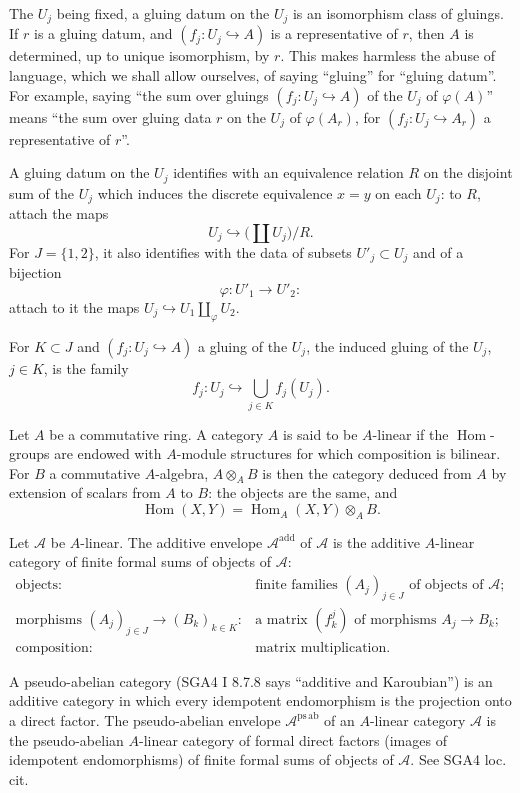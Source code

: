 \documentclass[11pt]{article}
\newcommand{\Hom}{\operatorname{Hom}}
\newcommand{\psab}{\mathrm{ps\,ab}}
\newcommand{\add}{\mathrm{add}}
\theoremstyle{deligne}
\newcommand{\para}[1]{\vspace{0.65em}\noindent{\bfseries #1}\quad}
\begin{document}
The \(U_j\) being fixed, a gluing datum on the \(U_j\) is an isomorphism class of gluings. If \(r\) is a gluing datum, and \((f_j:U_j\hookrightarrow A)\) is a representative of \(r\), then \(A\) is determined, up to unique isomorphism, by \(r\). This makes harmless the abuse of language, which we shall allow ourselves, of saying ``gluing'' for ``gluing datum''. For example, saying ``the sum over gluings \((f_j:U_j\hookrightarrow A)\) of the \(U_j\) of \(\varphi(A)\)'' means ``the sum over gluing data \(r\) on the \(U_j\) of \(\varphi(A_r)\), for \((f_j:U_j\hookrightarrow A_r)\) a representative of \(r\)''.

A gluing datum on the \(U_j\) identifies with an equivalence relation \(R\) on the disjoint sum of the \(U_j\) which induces the discrete equivalence \(x=y\) on each \(U_j\): to \(R\), attach the maps
\[
  U_j\hookrightarrow \bigl(\coprod U_j\bigr)/R.
\]
For \(J=\{1,2\}\), it also identifies with the data of subsets \(U'_j\subset U_j\) and of a bijection
\[
  \varphi:U'_1\longrightarrow U'_2:
\]
attach to it the maps \(U_j\hookrightarrow U_1\coprod_\varphi U_2\).

For \(K\subset J\) and \((f_j:U_j\hookrightarrow A)\) a gluing of the \(U_j\), the induced gluing of the \(U_j\), \(j\in K\), is the family
\[
  f_j:U_j\hookrightarrow \bigcup_{j\in K} f_j(U_j).
\]

\para{1.6.}
Let \(A\) be a commutative ring. A category \(A\) is said to be \(A\)-linear if the \(\Hom\)-groups are endowed with \(A\)-module structures for which composition is bilinear. For \(B\) a commutative \(A\)-algebra, \(A\otimes_A B\) is then the category deduced from \(A\) by extension of scalars from \(A\) to \(B\): the objects are the same, and
\[
  \Hom(X,Y)=\Hom_A(X,Y)\otimes_A B.
\]

\para{1.7.}
Let \(\mathcal A\) be \(A\)-linear. The additive envelope \(\mathcal A^{\add}\) of \(\mathcal A\) is the additive \(A\)-linear category of finite formal sums of objects of \(\mathcal A\):
\[
\begin{array}{rl}
\text{objects:}&\text{finite families }(A_j)_{j\in J}\text{ of objects of }\mathcal A;\\
\text{morphisms }(A_j)_{j\in J}\to(B_k)_{k\in K}:&
\text{a matrix }(f^j_k)\text{ of morphisms }A_j\to B_k;\\
\text{composition:}&\text{matrix multiplication.}
\end{array}
\]

\para{1.8.}
A pseudo-abelian category (SGA4 I 8.7.8 says ``additive and Karoubian'') is an additive category in which every idempotent endomorphism is the projection onto a direct factor. The pseudo-abelian envelope \(\mathcal A^{\psab}\) of an \(A\)-linear category \(\mathcal A\) is the pseudo-abelian \(A\)-linear category of formal direct factors (images of idempotent endomorphisms) of finite formal sums of objects of \(\mathcal A\). See SGA4 loc. cit.
\end{document}
